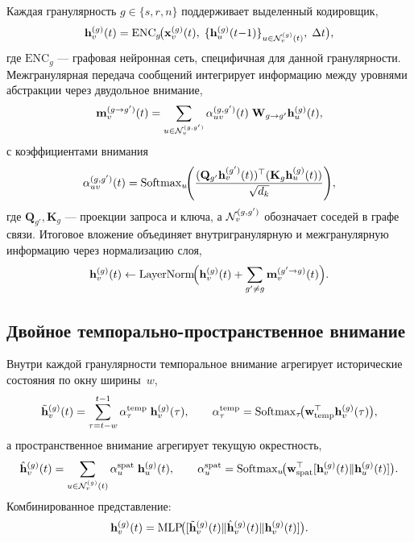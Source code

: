 Каждая гранулярность $g\in\{s,r,n\}$ поддерживает выделенный кодировщик,
\begin{equation}
\mathbf{h}_v^{(g)}(t)
= \mathrm{ENC}_g\!\bigl(
  \mathbf{x}_v^{(g)}(t),\;
  \{\mathbf{h}_u^{(g)}(t{-}1)\}_{u\in\mathcal{N}_v^{(g)}(t)},\;
  \Delta t
\bigr),
\label{eq:triple_enc}
\end{equation}
где $\mathrm{ENC}_g$ --- графовая нейронная сеть, специфичная для данной гранулярности. Межгранулярная передача сообщений интегрирует информацию между уровнями абстракции через двудольное внимание,
\begin{equation}
\mathbf{m}_v^{(g\to g')}(t)
= \sum_{u\in\mathcal{N}_v^{(g,g')}}
  \alpha_{uv}^{(g,g')}(t)\;\mathbf{W}_{g\to g'}\mathbf{h}_u^{(g)}(t),
\label{eq:triple_cross_msg}
\end{equation}
с коэффициентами внимания
\begin{equation}
\alpha_{uv}^{(g,g')}(t)
= \mathrm{Softmax}_u\!\Biggl(
  \frac{(\mathbf{Q}_{g'}\mathbf{h}_v^{(g')}(t))^\top
        (\mathbf{K}_g\mathbf{h}_u^{(g)}(t))}
       {\sqrt{d_k}}
\Biggr),
\label{eq:triple_cross_attn}
\end{equation}
где $\mathbf{Q}_{g'},\mathbf{K}_g$ --- проекции запроса и ключа, а $\mathcal{N}_v^{(g,g')}$ обозначает соседей в графе связи. Итоговое вложение объединяет внутригранулярную и межгранулярную информацию через нормализацию слоя,
\begin{equation}
\mathbf{h}_v^{(g)}(t)
\leftarrow
\mathrm{LayerNorm}\!\Bigl(
  \mathbf{h}_v^{(g)}(t)
  + \sum_{g'\neq g}\mathbf{m}_v^{(g'\to g)}(t)
\Bigr).
\label{eq:triple_fuse}
\end{equation}

\subsection{Двойное темпорально-пространственное внимание}

Внутри каждой гранулярности темпоральное внимание агрегирует исторические состояния по окну ширины~$w$,
\begin{equation}
\tilde{\mathbf{h}}_v^{(g)}(t)
= \sum_{\tau=t-w}^{t-1}
  \alpha_\tau^{\mathrm{temp}}\;\mathbf{h}_v^{(g)}(\tau),
\qquad
\alpha_\tau^{\mathrm{temp}}
= \mathrm{Softmax}_\tau\!\bigl(
  \mathbf{w}_{\mathrm{temp}}^\top\mathbf{h}_v^{(g)}(\tau)\bigr),
\label{eq:triple_temp_attn}
\end{equation}
а пространственное внимание агрегирует текущую окрестность,
\begin{equation}
\hat{\mathbf{h}}_v^{(g)}(t)
= \sum_{u\in\mathcal{N}_v^{(g)}(t)}
  \alpha_u^{\mathrm{spat}}\;\mathbf{h}_u^{(g)}(t),
\qquad
\alpha_u^{\mathrm{spat}}
= \mathrm{Softmax}_u\!\bigl(
  \mathbf{w}_{\mathrm{spat}}^\top
  [\mathbf{h}_v^{(g)}(t)\|\mathbf{h}_u^{(g)}(t)]\bigr).
\label{eq:triple_spat_attn}
\end{equation}
Комбинированное представление:
\begin{equation}
\mathbf{h}_v^{(g)}(t)
= \mathrm{MLP}\!\bigl(
  [\tilde{\mathbf{h}}_v^{(g)}(t)\|
   \hat{\mathbf{h}}_v^{(g)}(t)\|
   \mathbf{h}_v^{(g)}(t)]
\bigr).
\label{eq:triple_combined}
\end{equation}

